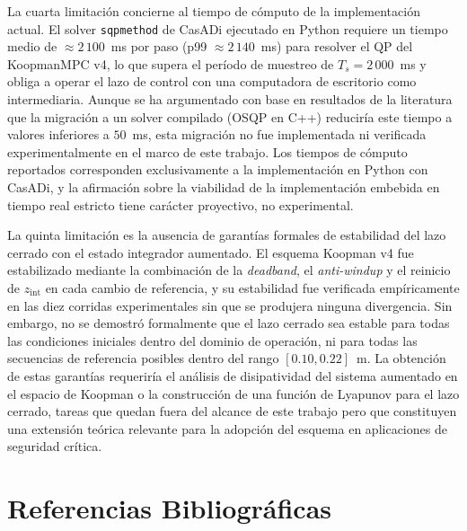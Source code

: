 \documentclass[12pt,letterpaper]{article}
\begin{document}
La cuarta limitación concierne al tiempo de cómputo de la 
implementación actual. El solver \texttt{sqpmethod} de 
CasADi ejecutado en Python requiere un tiempo medio de 
$\approx 2\,100$~ms por paso (p99 $\approx 2\,140$~ms) para 
resolver el QP del KoopmanMPC v4, lo que supera el período 
de muestreo de $T_s = 2\,000$~ms y obliga a operar el lazo 
de control con una computadora de escritorio como 
intermediaria. Aunque se ha argumentado con base en 
resultados de la literatura que la migración a un solver 
compilado (OSQP en C++) reduciría este tiempo a valores 
inferiores a $50$~ms, esta migración no fue implementada ni 
verificada experimentalmente en el marco de este trabajo. Los 
tiempos de cómputo reportados corresponden exclusivamente a 
la implementación en Python con CasADi, y la afirmación sobre 
la viabilidad de la implementación embebida en tiempo real 
estricto tiene carácter proyectivo, no experimental.

La quinta limitación es la ausencia de garantías formales 
de estabilidad del lazo cerrado con el estado integrador 
aumentado. El esquema Koopman v4 fue estabilizado mediante 
la combinación de la \textit{deadband}, el \textit{anti-windup} 
y el reinicio de $z_{\mathrm{int}}$ en cada cambio de 
referencia, y su estabilidad fue verificada empíricamente 
en las diez corridas experimentales sin que se produjera 
ninguna divergencia. Sin embargo, no se demostró 
formalmente que el lazo cerrado sea estable para todas 
las condiciones iniciales dentro del dominio de operación, 
ni para todas las secuencias de referencia posibles dentro 
del rango $[0.10, 0.22]$~m. La obtención de estas 
garantías requeriría el análisis de disipatividad del 
sistema aumentado en el espacio de Koopman o la 
construcción de una función de Lyapunov para el lazo 
cerrado, tareas que quedan fuera del alcance de este 
trabajo pero que constituyen una extensión teórica 
relevante para la adopción del esquema en aplicaciones 
de seguridad crítica.

\section{Referencias Bibliográficas}
\label{sec:referencias}
\end{document}
